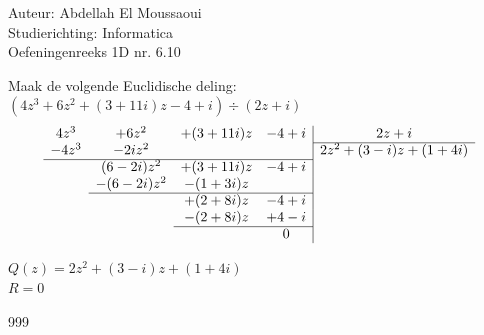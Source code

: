 \documentclass[a4paper]{article}
\begin{document}
  
\noindent \large Auteur: Abdellah El Moussaoui \\
\noindent \large Studierichting: Informatica\\
\noindent \large Oefeningenreeks 1D nr. 6.10\\

\medskip

\normalsize

Maak de volgende Euclidische deling: \\

$(4z^3 +6z^2 +(3+11i)z -4+i) \div (2z+i)$\\

$$
\begin{array}{cccc|c}
4z^3 & +6z^2 & +(3+11i)z & -4+i & 2z+i  \\ \cline{5-5}

-4z^3 & -2iz^2 &  &  & 2z^2+(3-i)z+(1+4i)  \\ \cline{1-4}

 & (6-2i)z^2 & +(3+11i)z & -4+i &    \\

 & -(6-2i)z^2 & -(1+3i)z &  &    \\ \cline{2-4}

 &  & +(2+8i)z & -4+i &    \\

 &  & -(2+8i)z & +4-i &   \\ \cline{3-4}

 &  &  & 0 & 
\end{array}
$$

$Q(z) = 2z^2+(3-i)z+(1+4i)$\\

$R = 0 $\\

\begin{thebibliography}{999}
\end{thebibliography}
\end{document}
